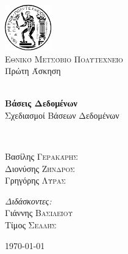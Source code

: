 \begin{titlepage}
\begin{center}

\includegraphics[width=0.15\textwidth]{title/Pyrforos2.png}\\[1.cm]
\textsc{\LARGE Εθνικό Μετσόβιο Πολυτεχνείο}\\[1.5cm]

\Large{ Πρώτη Άσκηση }\\[0.5cm]

\begin{doublespace}
\HRule \\[0.4cm]
{\huge \bfseries
Βάσεις Δεδομένων
}\\[0.4cm]
Σχεδιασμοί Βάσεων Δεδομένων\\
\end{doublespace}

\HRule \\[1.5cm]

\begin{minipage}{0.4\textwidth}
\begin{flushleft} \large
Βασίλης \textsc{Γερακάρης}\\
Διονύσης \textsc{Ζήνδρος}\\
Γρηγόρης \textsc{Λύρας}\\
\end{flushleft}
\end{minipage}
\begin{minipage}{0.4\textwidth}
\begin{flushright} \large
\emph{Διδάσκοντες:} \\
Γιάννης \textsc{Βασιλείου}\\
Τίμος \textsc{Σελλής}
\end{flushright}
\end{minipage}

\vfill

{\large \today}
\end{center}
\end{titlepage}
